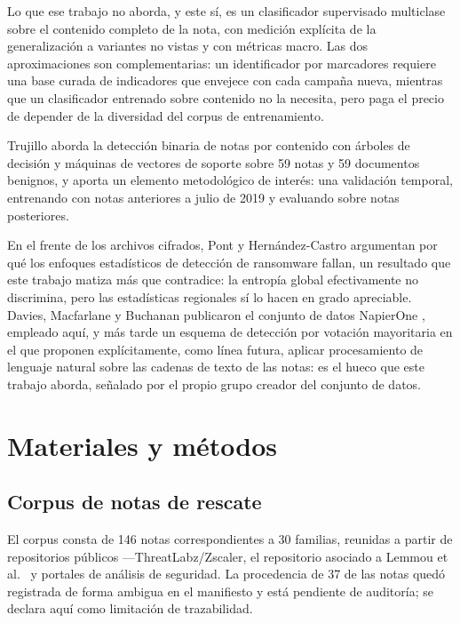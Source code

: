 \documentclass[11pt,a4paper]{article}
\begin{document}
Lo que ese trabajo no aborda, y este sí, es un clasificador supervisado multiclase sobre el
contenido completo de la nota, con medición explícita de la generalización a variantes no
vistas y con métricas macro. Las dos aproximaciones son complementarias: un identificador por
marcadores requiere una base curada de indicadores que envejece con cada campaña nueva,
mientras que un clasificador entrenado sobre contenido no la necesita, pero paga el precio de
depender de la diversidad del corpus de entrenamiento.

Trujillo \cite{trujillo2022} aborda la detección binaria de notas por contenido con árboles de
decisión y máquinas de vectores de soporte sobre 59 notas y 59 documentos benignos, y aporta un
elemento metodológico de interés: una validación temporal, entrenando con notas anteriores a
julio de 2019 y evaluando sobre notas posteriores.

En el frente de los archivos cifrados, Pont y Hernández-Castro \cite{pont2020} argumentan por
qué los enfoques estadísticos de detección de ransomware fallan, un resultado que este trabajo
matiza más que contradice: la entropía global efectivamente no discrimina, pero las
estadísticas regionales sí lo hacen en grado apreciable. Davies, Macfarlane y Buchanan
publicaron el conjunto de datos NapierOne \cite{napierone2021}, empleado aquí, y más tarde un
esquema de detección por votación mayoritaria \cite{davies2023} en el que proponen
explícitamente, como línea futura, aplicar procesamiento de lenguaje natural sobre las cadenas
de texto de las notas: es el hueco que este trabajo aborda, señalado por el propio grupo
creador del conjunto de datos.

\section{Materiales y métodos}

\subsection{Corpus de notas de rescate}

El corpus consta de 146 notas correspondientes a 30 familias, reunidas a partir de
repositorios públicos ---ThreatLabz/Zscaler, el repositorio asociado a
Lemmou et al.\ \cite{lemmou2021} y portales de análisis de seguridad. La procedencia de 37 de
las notas quedó registrada de forma ambigua en el manifiesto y está pendiente de auditoría;
se declara aquí como limitación de trazabilidad.
\end{document}
